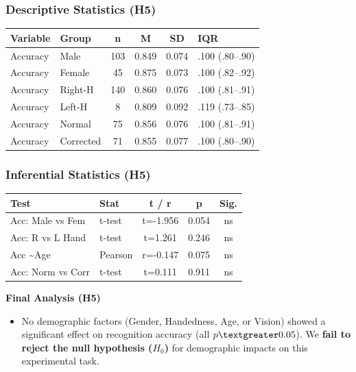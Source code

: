 \documentclass[10pt,a4paper]{article}
\begin{document}
\begin{minipage}{0.48\textwidth}
\subsubsection{Descriptive Statistics (H5)}
\begin{table}[H]
\centering\scriptsize
\begin{tabular}{l l c c c l}
\toprule
Variable & Group & n & M & SD & IQR \\
\midrule
Accuracy & Male & 103 & 0.849 & 0.074 & .100 (.80–.90) \\
Accuracy & Female & 45 & 0.875 & 0.073 & .100 (.82–.92) \\
Accuracy & Right-H & 140 & 0.860 & 0.076 & .100 (.81–.91) \\
Accuracy & Left-H & 8 & 0.809 & 0.092 & .119 (.73–.85) \\
Accuracy & Normal & 75 & 0.856 & 0.076 & .100 (.81–.91) \\
Accuracy & Corrected & 71 & 0.855 & 0.077 & .100 (.80–.90) \\
\bottomrule
\end{tabular}
\end{table}
\end{minipage}
\hfill
\begin{minipage}{0.48\textwidth}
\subsubsection{Inferential Statistics (H5)}
\begin{table}[H]
\centering\scriptsize
\begin{tabular}{l l c c c}
\toprule
Test & Stat & t / r & p & Sig. \\
\midrule
Acc: Male vs Fem & t-test & t=-1.956 & 0.054 & ns \\
Acc: R vs L Hand & t-test & t=1.261 & 0.246 & ns \\
Acc \textasciitilde Age & Pearson & r=-0.147 & 0.075 & ns \\
Acc: Norm vs Corr & t-test & t=0.111 & 0.911 & ns \\
\bottomrule
\end{tabular}
\end{table}
\end{minipage}

\textbf{Final Analysis (H5)}
\begin{itemize}
    \item No demographic factors (Gender, Handedness, Age, or Vision) showed a significant effect on recognition accuracy (all $p \textgreater 0.05$). We \textbf{fail to reject the null hypothesis ($H_0$)} for demographic impacts on this experimental task.
\end{itemize}
\end{document}
